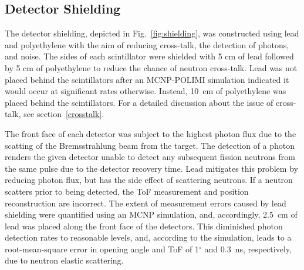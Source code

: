\subsection{Detector Shielding}
\label{shielding}
The detector shielding, depicted in Fig.~\ref{fig:shielding}, was constructed using lead and polyethylene with the aim of reducing cross-talk, the detection of photons, and noise.
The sides of each scintillator were shielded with 5 cm of lead followed by 5 cm of polyethylene to reduce the chance of neutron cross-talk.
Lead was not placed behind the scintillators after an MCNP-POLIMI simulation indicated it would occur at significant rates otherwise.
Instead, 10~cm of polyethylene was placed behind the scintillators.
For a detailed discussion about the issue of cross-talk, see section~\ref{crosstalk}.

The front face of each detector was subject to the highest photon flux due to the scatting of the Bremsstrahlung beam from the target.
The detection of a photon renders the given detector unable to detect any subsequent fission neutrons from the same pulse due to the detector recovery time.
Lead mitigates this problem by reducing photon flux, but has the side effect of scattering neutrons.
If a neutron scatters prior to being detected, the ToF measurement and position reconstruction are incorrect.
The extent of measurement errors caused by lead shielding were quantified using an MCNP simulation, and, accordingly, 2.5~cm of lead was placed along the front face of the detectors.
This diminished photon detection rates to reasonable levels, and, according to the simulation, leads to a root-mean-square error in opening angle and ToF of 1$^{\circ}$ and 0.3~ns, respectively, due to neutron elastic scattering.

